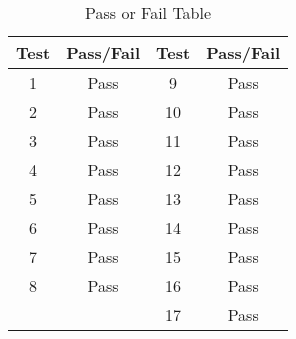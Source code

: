 \begin{table}[H]
	\caption{Pass or Fail Table}
	\label{tab:label}
	\centering \fontsize{10}{10}\selectfont
	\begin{tabular}{ c | c | c | c } %
		\hline 
		Test & Pass/Fail & Test    & Pass/Fail\\
		\hline 
		1 & \color{ForestGreen}Pass & 9  & \color{ForestGreen}Pass \\
		2 & \color{ForestGreen}Pass & 10 & \color{ForestGreen}Pass \\
		3 & \color{ForestGreen}Pass & 11 & \color{ForestGreen}Pass \\
		4 & \color{ForestGreen}Pass & 12 & \color{ForestGreen}Pass \\
		5 & \color{ForestGreen}Pass & 13 & \color{ForestGreen}Pass \\
		6 & \color{ForestGreen}Pass & 14 & \color{ForestGreen}Pass \\
		7 & \color{ForestGreen}Pass & 15 & \color{ForestGreen}Pass \\
		8 & \color{ForestGreen}Pass & 16 & \color{ForestGreen}Pass \\
		&                         & 17 & \color{ForestGreen}Pass \\
		\hline
	\end{tabular}
\end{table}